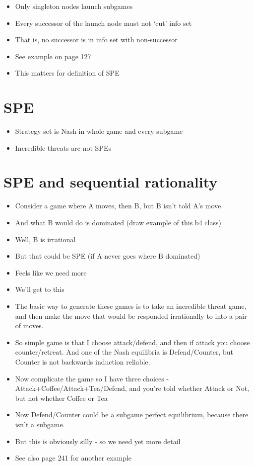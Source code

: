 \documentclass[11pt,]{article}
\providecommand{\tightlist}{%
  \setlength{\itemsep}{0pt}\setlength{\parskip}{0pt}}
\begin{document}
\begin{itemize}
\tightlist
\item
  Only singleton nodes launch subgames
\item
  Every successor of the launch node must not `cut' info set
\item
  That is, no successor is in info set with non-successor
\item
  See example on page 127
\item
  This matters for definition of SPE
\end{itemize}

\hypertarget{spe}{%
\section{SPE}\label{spe}}

\begin{itemize}
\tightlist
\item
  Strategy set is Nash in whole game and every subgame
\item
  Incredible threats are not SPEs
\end{itemize}

\hypertarget{spe-and-sequential-rationality}{%
\section{SPE and sequential
rationality}\label{spe-and-sequential-rationality}}

\begin{itemize}
\tightlist
\item
  Consider a game where A moves, then B, but B isn't told A's move
\item
  And what B would do is dominated (draw example of this b4 class)
\item
  Well, B is irrational
\item
  But that could be SPE (if A never goes where B dominated)
\item
  Feels like we need more
\item
  We'll get to this
\item
  The basic way to generate these games is to take an incredible threat
  game, and then make the move that would be responded irrationally to
  into a pair of moves.
\item
  So simple game is that I choose attack/defend, and then if attack you
  choose counter/retreat. And one of the Nash equilibria is
  Defend/Counter, but Counter is not backwards induction reliable.
\item
  Now complicate the game so I have three choices -
  Attack+Coffee/Attack+Tea/Defend, and you're told whether Attack or
  Not, but not whether Coffee or Tea
\item
  Now Defend/Counter could be a subgame perfect equilibrium, because
  there isn't a subgame.
\item
  But this is obviously silly - so we need yet more detail
\item
  See also page 241 for another example
\end{itemize}
\end{document}
